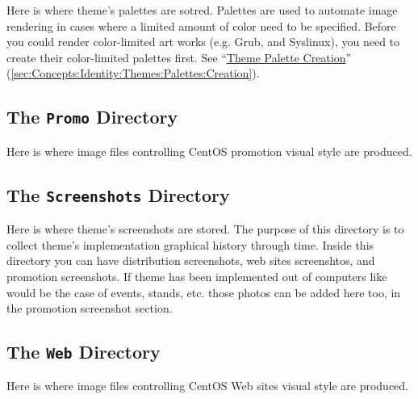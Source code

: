 Here is where theme's palettes are sotred. Palettes are used to
automate image rendering in cases where a limited amount of color need
to be specified. Before you could render color-limited art works (e.g.
Grub, and Syslinux), you need to create their color-limited palettes
first. See
``\hyperlink{sec:Concepts:Identity:Themes:Palettes:Creation}{Theme
Palette Creation}''
(\autoref{sec:Concepts:Identity:Themes:Palettes:Creation}).

\subsection{The \texttt{Promo} Directory}
\hypertarget{sec:Concepts:Identity:Themes:Files:Promo}{}
\label{sec:Concepts:Identity:Themes:Files:Promo}

Here is where image files controlling CentOS promotion visual style
are produced.

\subsection{The \texttt{Screenshots} Directory}
\hypertarget{sec:Concepts:Identity:Themes:Files:Screenshots}{}
\label{sec:Concepts:Identity:Themes:Files:Screenshots}

Here is where theme's screenshots are stored. The purpose of this
directory is to collect theme's implementation graphical history
through time. Inside this directory you can have distribution
screenshots, web sites screenshtos, and promotion screenshots. If
theme has been implemented out of computers like would be the case of
events, stands, etc. those photos can be added here too, in the
promotion screenshot section.

\subsection{The \texttt{Web} Directory}
\hypertarget{sec:Concepts:Identity:Themes:Files:Web}{}
\label{sec:Concepts:Identity:Themes:Files:Web}

Here is where image files controlling CentOS Web sites visual style
are produced.
